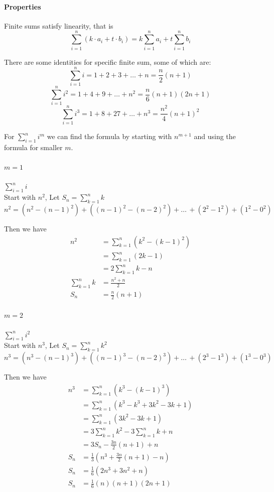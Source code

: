 \documentclass[12pt]{article}
\begin{document}
\paragraph{Properties} Finite sums satisfy linearity, that is
\[
    \sum_{i = 1}^n (k \cdot a_i + t \cdot b_i) = k \sum_{i = 1}^n a_i + t \sum_{i = 1}^n b_i
\]

\noindent
There are some identities for specific finite sum, some of which are:
\[
    \sum_{i = 1}^n i = 1 + 2 + 3 + \dots + n = \frac{n}{2}(n + 1)
\]
\[
    \sum_{i = 1}^n i^2 = 1 + 4 + 9 + \dots + n^2 = \frac{n}{6}(n + 1)(2n + 1)
\]
\[
    \sum_{i = 1}^n i^3 = 1 + 8 + 27 + \dots + n^3 = \frac{n^2}{4}(n + 1)^2
\]

For $\sum_{i = 1}^n i^m$ we can find the formula by starting with $n^{m + 1}$ and using the formula for smaller $m$.

\paragraph{$m = 1$}  $\sum_{i = 1}^n i$ \\
Start with $n^2$, Let $S_n = \sum_{k = 1}^n k$
\[
    n^2 = (n^2 - (n - 1)^2) + ((n - 1)^2 - (n - 2)^2) + \dots\, + (2^2 - 1^2) + (1^2 - 0^2)
\]

Then we have
\begin{align*} 
    n^2 &= \sum_{k = 1}^n (k^2 - (k - 1)^2) \\
    &= \sum_{k = 1}^n (2k - 1) \\
    &= 2 \sum_{k = 1}^n k - n \\
    \sum_{k = 1}^n k &= \frac{n^2 + n}{2} \\
    S_n &= \frac{n}{2} (n + 1)
\end{align*}

\paragraph{$m = 2$}  $\sum_{i = 1}^n i^2$ \\
Start with $n^3$, Let $S_n = \sum_{k = 1}^n k^2$
\[
    n^3 = (n^3 - (n - 1)^3) + ((n - 1)^3 - (n - 2)^3) + \dots\, + (2^3 - 1^3) + (1^3 - 0^3)
\]

Then we have
\begin{align*} 
    n^3 &= \sum_{k = 1}^n (k^3 - (k - 1)^3) \\
    &= \sum_{k = 1}^n (k^3 - k^3 + 3k^2 - 3k + 1) \\
    &= \sum_{k = 1}^n (3k^2 - 3k + 1) \\
    &= 3 \sum_{k = 1}^n k^2 - 3 \sum_{k = 1}^n k + n \\
    &= 3 S_n - \frac{3n}{2} (n + 1) + n \\
    S_n &= \frac{1}{3}(n^3 + \frac{3n}{2} (n + 1) - n) \\
    S_n &= \frac{1}{6}(2n^3 + 3n^2 + n) \\
    S_n &= \frac{1}{6}(n)(n + 1)(2n + 1) \\
\end{align*}
\end{document}
